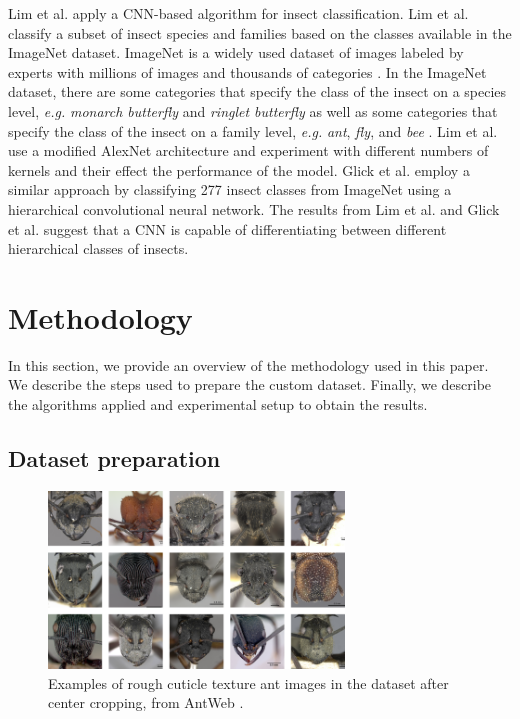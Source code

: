 \documentclass{aci}
\numberwithin{equation}{section}
\begin{document}
Lim et al. \cite{lim_performance_2017} apply a CNN-based algorithm for insect
classification. Lim et al. \cite{lim_performance_2017} classify a subset of
insect species and families based on the classes available in the ImageNet
dataset. ImageNet is a widely used dataset of images labeled by experts with
millions of images and thousands of categories \cite{deng_imagenet_2009}. In the
ImageNet dataset, there are some categories that specify the class of the insect
on a species level, \textit{e.g.} \textit{monarch butterfly} and \textit{ringlet
    butterfly} as well as some categories that specify the class of the insect on a
family level, \textit{e.g.} \textit{ant}, \textit{fly}, and \textit{bee}
\cite{deng_imagenet_2009}. Lim et al. \cite{lim_performance_2017} use a modified
AlexNet architecture and experiment with different numbers of kernels and their
effect the performance of the model. Glick et al. \cite{glick_insect_2016}
employ a similar approach by classifying 277 insect classes from ImageNet using
a hierarchical convolutional neural network. The results from Lim et al.
\cite{lim_performance_2017} and Glick et al. \cite{glick_insect_2016} suggest
that a CNN is capable of differentiating between different hierarchical classes
of insects.

\section{Methodology}

In this section, we provide an overview of the methodology used in this paper.
We describe the steps used to prepare the custom dataset. Finally, we describe
the algorithms applied and experimental setup to obtain the results.

\subsection{Dataset preparation} %

\begin{figure}[h]
    \centering
    \includegraphics[width=0.7\textwidth]{assets/images/rough_full_collage.png}
    \caption{Examples of rough cuticle texture ant images in the dataset after
        center cropping, from AntWeb \cite{perrichot_antweb_2012}.}
    \label{fig:rough-cuticle-texture}
\end{figure}
\end{document}
